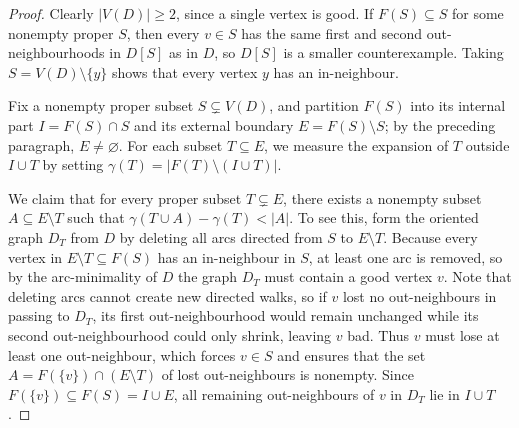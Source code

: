 \documentclass[11pt]{amsart}
\theoremstyle{remark}
\newcommand{\abs}[1]{\lvert #1\rvert}
\begin{document}
\begin{proof}
Clearly $\abs{V(D)}\ge2$, since a single vertex is good. If $F(S)\subseteq S$ for some nonempty proper $S$, then every $v\in S$ has the same first and second out-neighbourhoods in $D[S]$ as in $D$, so $D[S]$ is a smaller counterexample. Taking $S=V(D)\setminus\{y\}$ shows that every vertex $y$ has an in-neighbour.

Fix a nonempty proper subset $S\subsetneq V(D)$, and partition $F(S)$ into its internal part $I=F(S)\cap S$ and its external boundary $E=F(S)\setminus S$; by the preceding paragraph, $E\neq\varnothing$. For each subset $T\subseteq E$, we measure the expansion of $T$ outside $I\cup T$ by setting $\gamma(T)=\abs{F(T)\setminus(I\cup T)}$.

We claim that for every proper subset $T\subsetneq E$, there exists a nonempty subset $A\subseteq E\setminus T$ such that $\gamma(T\cup A)-\gamma(T)<\abs A$. To see this, form the oriented graph $D_T$ from $D$ by deleting all arcs directed from $S$ to $E\setminus T$. Because every vertex in $E\setminus T\subseteq F(S)$ has an in-neighbour in $S$, at least one arc is removed, so by the arc-minimality of $D$ the graph $D_T$ must contain a good vertex $v$. Note that deleting arcs cannot create new directed walks, so if $v$ lost no out-neighbours in passing to $D_T$, its first out-neighbourhood would remain unchanged while its second out-neighbourhood could only shrink, leaving $v$ bad. Thus $v$ must lose at least one out-neighbour, which forces $v\in S$ and ensures that the set $A=F(\{v\})\cap(E\setminus T)$ of lost out-neighbours is nonempty. Since $F(\{v\})\subseteq F(S)=I\cup E$, all remaining out-neighbours of $v$ in $D_T$ lie in $I\cup T$.


\end{proof}
\end{document}
